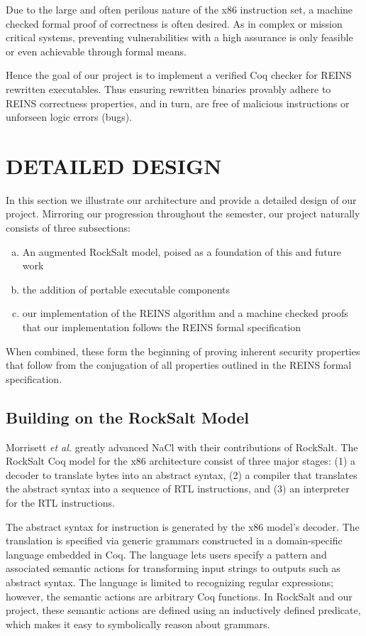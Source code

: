 \documentclass[conference]{IEEEtran}
\begin{document}
Due to the large and often perilous nature of the x86 instruction set, a machine checked formal proof of correctness is often desired.  
As in complex or mission critical systems, preventing vulnerabilities with a high assurance is only feasible or even achievable through formal means.  

Hence the goal of our project is to implement a verified Coq checker for REINS rewritten executables. 
Thus ensuring rewritten binaries provably adhere to REINS correctness properties, and in turn, are free of malicious instructions or unforseen logic errors (bugs). 

\section{DETAILED DESIGN}

In this section we illustrate our architecture and provide a detailed design of our project.  
Mirroring our progression throughout the semester, our project naturally consists of three subsections:
\begin{enumerate}[(a)] 
\item An augmented RockSalt model, poised as a foundation of this and future work  
\item the addition of portable executable components 
\item our implementation of the REINS algorithm and a machine checked proofs that our implementation follows the REINS formal specification
\end{enumerate}
When combined, these form the beginning of proving inherent security properties that follow from the conjugation of all properties outlined in the REINS formal specification.

\subsection{Building on the RockSalt Model}

Morrisett \emph{et al.} greatly advanced NaCl with their contributions of RockSalt.  
The RockSalt Coq model for the x86 architecture consist of three major stages: (1) a decoder to translate bytes into an abstract syntax, (2) a compiler that translates the abstract syntax into a sequence of RTL instructions, and (3) an interpreter for the RTL instructions.
 
The abstract syntax for instruction is generated by the x86 model's decoder.  
The translation is specified via generic grammars constructed in a domain-specific language embedded in Coq.
The language lets users specify a pattern and associated semantic actions for transforming input strings to outputs such as abstract syntax.
The language is limited to recognizing regular expressions; however, the semantic actions are arbitrary Coq functions. 
In RockSalt and our project, these semantic actions are defined using an inductively defined predicate, which makes it easy to symbolically reason about grammars.  
\end{document}
